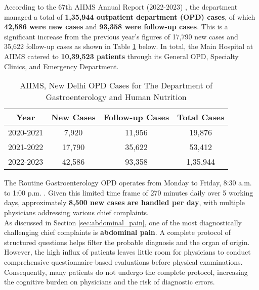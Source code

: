 \noindent According to the 67th AIIMS Annual Report (2022-2023) \cite{AIIMS2024}, the department managed a total of \textcolor{TUMRed}{\textbf{1,35,944 outpatient department (OPD) cases}}, of which \textcolor{TUMRed}{\textbf{42,586 were new cases}} and \textcolor{TUMRed}{\textbf{93,358 were follow-up cases}}. This is a significant increase from the previous year's figures of 17,790 new cases and 35,622 follow-up cases as shown in Table \ref{tab:aiims_opd} below. In total, the Main Hospital at AIIMS catered to \textcolor{TUMRed}{\textbf{10,39,523 patients}} through its General OPD, Specialty Clinics, and Emergency Department.

\begin{table}[h]
    \centering
    \begin{tabular}{|c|c|c|c|}
        \hline
        \textbf{Year} & \textbf{New Cases} & \textbf{Follow-up Cases} & \textbf{Total Cases} \\
        \hline
        2020-2021 & 7,920 & 11,956 & 19,876 \\
        2021-2022 & 17,790 & 35,622 & 53,412 \\
        2022-2023 & 42,586 & 93,358 & 1,35,944 \\
        \hline
    \end{tabular}
    \caption{AIIMS, New Delhi OPD Cases for The Department of Gastroenterology and Human Nutrition}
    \label{tab:aiims_opd}
\end{table}

\noindent The Routine Gastroenterology OPD operates from Monday to Friday, 8:30 a.m. to 1:00 p.m. \cite{AIIMSOPD}. Given this limited time frame of 270 minutes daily over 5 working days, approximately \textcolor{TUMRed}{\textbf{8,500 new cases are handled per day}}, with multiple physicians addressing various chief complaints.\\[\baselineskip]

\noindent As discussed in Section \ref{sec:abdominal_pain}, one of the most diagnostically challenging chief complaints is \textcolor{TUMRed}{\textbf{abdominal pain}}. A complete protocol of structured questions helps filter the probable diagnosis and the organ of origin. However, the high influx of patients leaves little room for physicians to conduct comprehensive questionnaire-based evaluations before physical examinations. Consequently, many patients do not undergo the complete protocol, increasing the cognitive burden on physicians and the risk of diagnostic errors.\\[\baselineskip]

